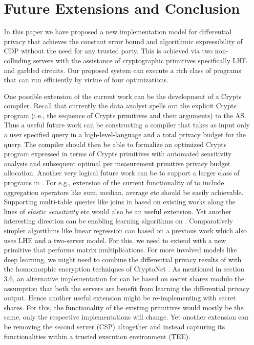 
\section{Future Extensions and Conclusion}
In this paper we have proposed a new implementation model for differential privacy that achieves the constant error bound and  algorithmic expressibility of \textsf{CDP} without the need for any trusted party. This is achieved via two non-colluding servers with the assistance of cryptographic primitives specifically \textsf{LHE} and garbled circuits. Our proposed system \system can execute a rich class of programs that can run  efficiently by virtue of four optimizations.
\par  One possible extension of the current work can be the development of a
Crypt$\epsilon$ compiler. Recall that currently the data analyst spells out the explicit Crypt$\epsilon$ program  (i.e., the sequence of Crypt$\epsilon$ primitives and their arguments) to the \textsf{AS}. Thus a useful future work can be constructing a compiler that takes as input only a user specified query in a high-level-language and a total privacy budget for the query. The
compiler should then be able to formalize an optimized Crypt$\epsilon$ program expressed in terms of Crypt$\epsilon$ primitives with automated sensitivity analysis and subsequent optimal per measurement primitive privacy budget allocation. 
Another very logical future work can be to support a larger class of programs in \system. For e.g., extension of the current functionality of \system to include aggregation operators like sum, median, average etc should be easily achievable. Supporting  multi-table queries like joins in \system based on existing works along the lines of \emph{elastic sensitivity} \cite{elastic} etc would also be an useful extension.  Yet another interesting direction can be enabling learning algorithms on \system.   Comparatively simpler algorithms like linear regression can based on a previous work \cite{LReg} which also uses \textsf{LHE} and a two-server model. For this, we need to extend \system with a new primitive that performs matrix multiplications. For more involved models like deep learning, we might need to combine the differential privacy results of \cite{DLDP} with the homomorphic encryption techniques of  CryptoNet \cite{CryptoNet}. As mentioned in section 3.6, an alternative implementation for \system  can be based on secret shares modulo the assumption that both the servers are benefit from learning the differential privacy output. Hence another useful extension might be re-implementing \system with  secret shares. For this, the functionality of the existing primitives would mostly be the same, only the respective implementations will change. 
Yet another extension can be removing the second server (\textsf{CSP}) altogether and instead capturing its functionalities within a trusted execution environment (TEE).
